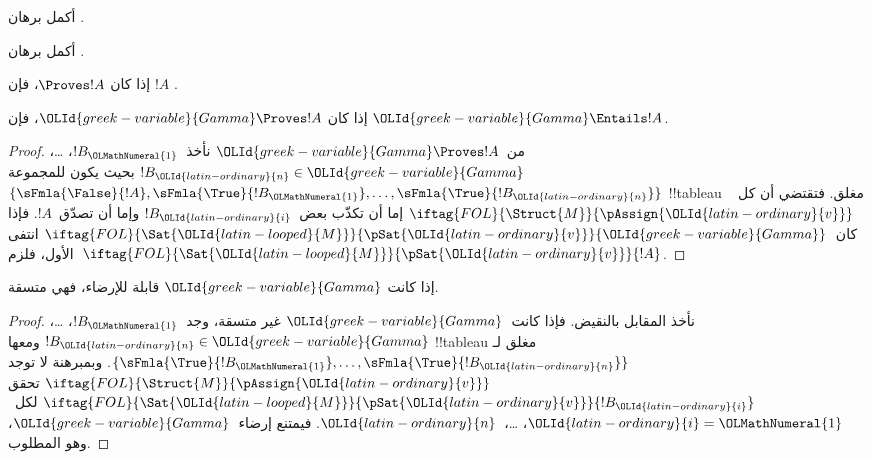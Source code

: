 \documentclass[../../../include/open-logic-section]{subfiles}
\begin{document}
\begin{prob}
أكمل برهان .
\end{prob}
\tagendprob

\begin{prob}
أكمل برهان .
\end{prob}
\tagendprob

\begin{cor}
إذا كان $\Proves !A$، فإن $!A$ .
\end{cor}

\begin{cor}
إذا كان ${\OLId{greek-variable}{Gamma}} \Proves !A$، فإن ${\OLId{greek-variable}{Gamma}} \Entails !A$.
\end{cor}

\begin{proof}
  من~${\OLId{greek-variable}{Gamma}} \Proves !A$ نأخذ~$!B_{\OLMathNumeral{1}}$، \dots، $!B_{\OLId{latin-ordinary}{n}} \in
  {\OLId{greek-variable}{Gamma}}$ بحيث يكون للمجموعة~$\{\sFmla{\False}{!A}, \sFmla{\True}{!B_{\OLMathNumeral{1}}}, \dots,
  \sFmla{\True}{!B_{\OLId{latin-ordinary}{n}}}\}$ !!{tableau} مغلق. فتقتضي
   أن كل
  ~$\iftag{FOL}{\Struct{M}}{\pAssign{{\OLId{latin-ordinary}{v}}}}$
  إما أن تكذّب بعض~$!B_{\OLId{latin-ordinary}{i}}$ وإما أن تصدّق~$!A$.
  فإذا كان~$\iftag{FOL}{\Sat{{\OLId{latin-looped}{M}}}}{\pSat{{\OLId{latin-ordinary}{v}}}}{{\OLId{greek-variable}{Gamma}}}$ انتفى الأول،
  فلزم~$\iftag{FOL}{\Sat{{\OLId{latin-looped}{M}}}}{\pSat{{\OLId{latin-ordinary}{v}}}}{!A}$.
\end{proof}

\begin{cor}
إذا كانت ${\OLId{greek-variable}{Gamma}}$ قابلة للإرضاء، فهي متسقة.
\end{cor}

\begin{proof}
نأخذ المقابل بالنقيض. فإذا كانت~${\OLId{greek-variable}{Gamma}}$ غير متسقة، وجد~$!B_{\OLMathNumeral{1}}$،
\dots، $!B_{\OLId{latin-ordinary}{n}} \in {\OLId{greek-variable}{Gamma}}$ ومعها !!{tableau} مغلق لـ
$\{\sFmla{\True}{!B_{\OLMathNumeral{1}}}, \dots, \sFmla{\True}{!B_{\OLId{latin-ordinary}{n}}}\}$.
وبمبرهنة  لا توجد
$\iftag{FOL}{\Struct{M}}{\pAssign{{\OLId{latin-ordinary}{v}}}}$ تحقق
$\iftag{FOL}{\Sat{{\OLId{latin-looped}{M}}}}{\pSat{{\OLId{latin-ordinary}{v}}}}{!B_{\OLId{latin-ordinary}{i}}}$ لكل~${\OLId{latin-ordinary}{i}}={\OLMathNumeral{1}}$، \dots،~${\OLId{latin-ordinary}{n}}$.
فيمتنع إرضاء~${\OLId{greek-variable}{Gamma}}$، وهو المطلوب.
\end{proof}
\end{document}
